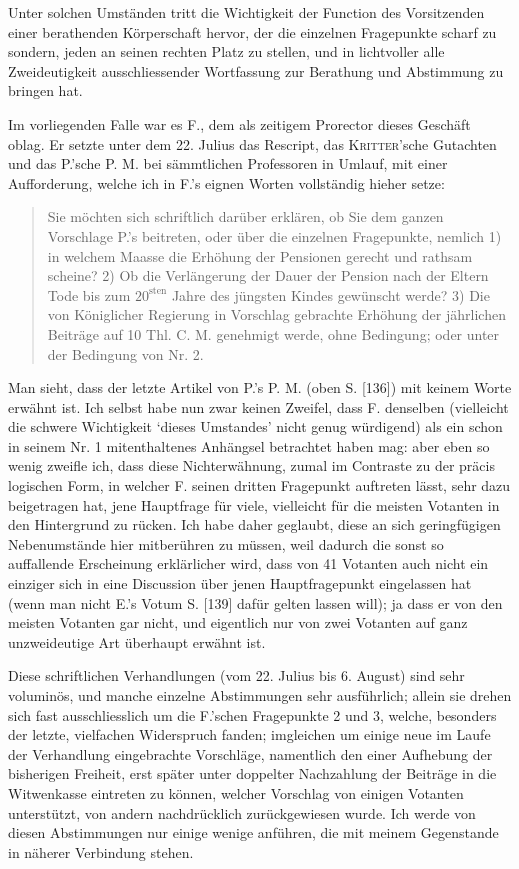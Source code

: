\par{}
Unter solchen Umständen tritt die Wichtigkeit der Function des Vorsitzenden einer berathenden Körperschaft hervor, der die einzelnen Fragepunkte scharf zu sondern, jeden an seinen rechten Platz zu stellen, und in lichtvoller alle Zweideutigkeit ausschliessender Wortfassung zur Berathung und Abstimmung zu bringen hat.

Im vorliegenden Falle war es F., dem als zeitigem Prorector dieses Geschäft oblag. Er setzte unter dem 22. Julius das Rescript, das \textsc{Kritter}’sche Gutachten und das P.’sche P. M. bei sämmtlichen Professoren in Umlauf, mit einer Aufforderung, welche ich in F.’s eignen Worten vollständig hieher setze:
\begin{quote}
Sie möchten sich schriftlich darüber erklären, ob Sie dem ganzen Vorschlage P.’s beitreten, oder über die einzelnen Fragepunkte, nemlich 1) in welchem Maasse die Erhöhung der Pensionen gerecht und rathsam scheine? 2) Ob die Verlängerung der Dauer der Pension nach der Eltern Tode bis zum \(20^{\text{sten}}\) Jahre des jüngsten Kindes gewünscht werde? 3) Die von Königlicher Regierung in Vorschlag gebrachte Erhöhung der jährlichen Beiträge auf 10 Thl. C. M. genehmigt werde, ohne Bedingung; oder unter der Bedingung von Nr. 2.
\end{quote}
\noindent\hspace*{\parindent}Man sieht, dass der letzte Artikel von P.’s P. M. (oben S. [136]) mit keinem Worte erwähnt ist. Ich selbst habe nun zwar keinen Zweifel, dass F. denselben (vielleicht die schwere Wichtigkeit ‘dieses Umstandes’ nicht genug würdigend) als ein schon in seinem Nr. 1 mitenthaltenes Anhängsel betrachtet haben mag: aber eben so wenig zweifle ich, dass diese Nichterwähnung, zumal im Contraste zu der präcis logischen Form, in welcher F. seinen dritten Fragepunkt auftreten lässt, sehr dazu beigetragen hat, jene Hauptfrage für viele, vielleicht für die meisten Votanten in den Hintergrund zu rücken. Ich habe daher geglaubt, diese an sich geringfügigen Nebenumstände hier mitberühren zu müssen, weil dadurch die sonst so auffallende Erscheinung erklärlicher wird, dass von 41 Votanten auch nicht ein einziger sich in eine Discussion über jenen Hauptfragepunkt eingelassen hat (wenn man nicht E.’s Votum S. [139] dafür gelten lassen will); ja dass er von den meisten Votanten gar nicht, und eigentlich nur von zwei Votanten auf ganz unzweideutige Art überhaupt erwähnt ist.

Diese schriftlichen Verhandlungen (vom 22. Julius bis 6. August) sind sehr voluminös, und manche einzelne Abstimmungen sehr ausführlich; allein sie drehen sich fast ausschliesslich um die F.’schen Fragepunkte 2 und 3, welche, besonders der letzte, vielfachen Widerspruch fanden; imgleichen um einige neue im Laufe der Verhandlung eingebrachte Vorschläge, namentlich den einer Aufhebung der bisherigen Freiheit, erst später unter doppelter Nachzahlung der Beiträge in die Witwenkasse eintreten zu können, welcher Vorschlag von einigen Votanten unterstützt, von andern nachdrücklich zurückgewiesen wurde. Ich werde von diesen Abstimmungen nur einige wenige anführen, die mit meinem Gegenstande in näherer Verbindung stehen.

